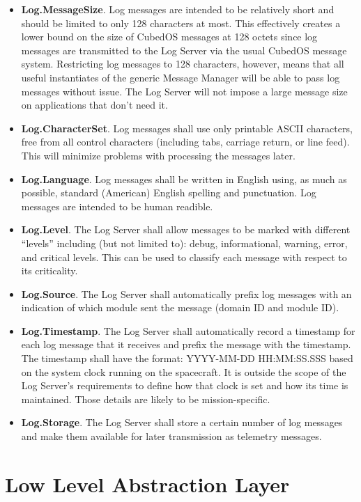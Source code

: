 \begin{itemize}
  \item \textbf{Log.MessageSize}. Log messages are intended to be relatively short and should be
    limited to only 128 characters at most. This effectively creates a lower bound on the size
    of CubedOS messages at 128 octets since log messages are transmitted to the Log Server via
    the usual CubedOS message system. Restricting log messages to 128 characters, however, means
    that all useful instantiates of the generic Message Manager will be able to pass log
    messages without issue. The Log Server will not impose a large message size on applications
    that don't need it.
  \item \textbf{Log.CharacterSet}. Log messages shall use only printable ASCII characters, free
    from all control characters (including tabs, carriage return, or line feed). This will
    minimize problems with processing the messages later.
  \item \textbf{Log.Language}. Log messages shall be written in English using, as much as
    possible, standard (American) English spelling and punctuation. Log messages are intended to
    be human readible.
  \item \textbf{Log.Level}. The Log Server shall allow messages to be marked with different
    ``levels'' including (but not limited to): debug, informational, warning, error, and
    critical levels. This can be used to classify each message with respect to its criticality.
  \item \textbf{Log.Source}. The Log Server shall automatically prefix log messages with an
    indication of which module sent the message (domain ID and module ID).
  \item \textbf{Log.Timestamp}. The Log Server shall automatically record a timestamp for each
    log message that it receives and prefix the message with the timestamp. The timestamp shall
    have the format: YYYY-MM-DD HH:MM:SS.SSS based on the system clock running on the
    spacecraft. It is outside the scope of the Log Server's requirements to define how that
    clock is set and how its time is maintained. Those details are likely to be
    mission-specific.
  \item \textbf{Log.Storage}. The Log Server shall store a certain number of log messages and
    make them available for later transmission as telemetry messages. 
\end{itemize}

\section{Low Level Abstraction Layer}
\label{sec:llal}

